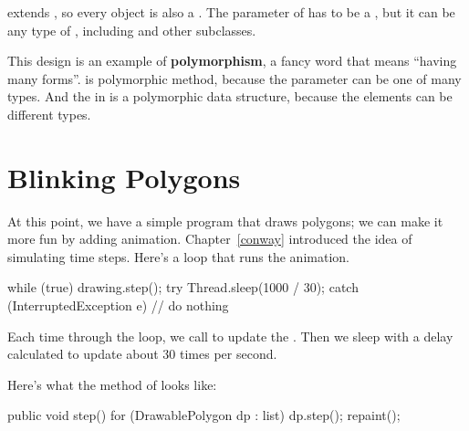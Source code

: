 
 extends , so every  object is also a .
The parameter of  has to be a , but it can be any type of , including  and other subclasses.


This design is an example of {\bf polymorphism}, a fancy word that means ``having many forms''.
 is polymorphic method, because the parameter can be one of many types.
And the  in  is a polymorphic data structure, because the elements can be different types.




\section{Blinking Polygons}

At this point, we have a simple program that draws polygons; we can make it more fun by adding animation.
Chapter~\ref{conway} introduced the idea of simulating time steps.
Here's a loop that runs the animation.

\begin{code}
while (true) {
    drawing.step();
    try {
        Thread.sleep(1000 / 30);
    } catch (InterruptedException e) {
        // do nothing
    }
}
\end{code}

Each time through the loop, we call  to update the .
Then we sleep with a delay calculated to update about 30 times per second.

Here's what the  method of  looks like:

\begin{code}
public void step() {
    for (DrawablePolygon dp : list) {
        dp.step();
    }
    repaint();
}
\end{code}

